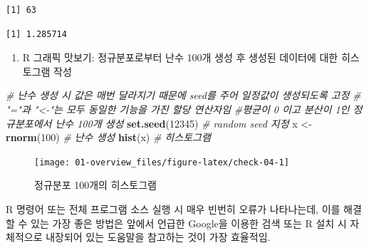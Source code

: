 \documentclass[
  11pt,
]{krantz}
\newenvironment{Shaded}{\begin{snugshade}}{\end{snugshade}}
\newcommand{\CommentTok}[1]{\textcolor[rgb]{0.37,0.37,0.37}{\textit{#1}}}
\newcommand{\DecValTok}[1]{\textcolor[rgb]{0.06,0.06,0.06}{#1}}
\newcommand{\KeywordTok}[1]{\textcolor[rgb]{0.27,0.27,0.27}{\textbf{#1}}}
\newcommand{\NormalTok}[1]{#1}
\newcommand{\StringTok}[1]{\textcolor[rgb]{0.5,0.5,0.5}{#1}}
\providecommand{\tightlist}{%
  \setlength{\itemsep}{0pt}\setlength{\parskip}{0pt}}
\let\BeginKnitrBlock\begin \let\EndKnitrBlock\end
\begin{document}
\begin{verbatim}
[1] 63
\end{verbatim}

\begin{verbatim}
[1] 1.285714
\end{verbatim}

\normalsize

\begin{enumerate}
\def\labelenumi{\arabic{enumi}.}
\setcounter{enumi}{4}
\tightlist
\item
  R 그래픽 맛보기: 정규분포로부터 난수 100개 생성 후 생성된 데이터에 대한 히스토그램 작성
\end{enumerate}

\footnotesize

\begin{Shaded}
\begin{Highlighting}[]
\CommentTok{# 난수 생성 시 값은 매번 달라지기 때문에 seed를 주어 일정값이 생성되도록 고정}
\CommentTok{# "="과 "<-"는 모두 동일한 기능을 가진 할당 연산자임}
\CommentTok{#평균이 0 이고 분산이 1인 정규분포에서 난수 100개 생성}
\KeywordTok{set.seed}\NormalTok{(}\DecValTok{12345}\NormalTok{) }\CommentTok{# random seed 지정}
\NormalTok{x <-}\StringTok{ }\KeywordTok{rnorm}\NormalTok{(}\DecValTok{100}\NormalTok{) }\CommentTok{# 난수 생성}
\KeywordTok{hist}\NormalTok{(x) }\CommentTok{# 히스토그램}
\end{Highlighting}
\end{Shaded}

\begin{figure}

{\centering \texttt{[image: 01-overview\_files/figure-latex/check-04-1]} 

}

\caption{정규분포 100개의 히스토그램}\label{fig:check-04}
\end{figure}

\normalsize

\footnotesize

\BeginKnitrBlock{rmdtip}
R 명령어 또는 전체 프로그램 소스 실행 시 매우 빈번히 오류가 나타나는데, 이를 해결할 수 있는 가장 좋은 방법은 앞에서 언급한 Google을 이용한 검색 또는 R 설치 시 자체적으로 내장되어 있는 도움말을 참고하는 것이 가장 효율적임.
\EndKnitrBlock{rmdtip}

\normalsize

\footnotesize
\end{document}
